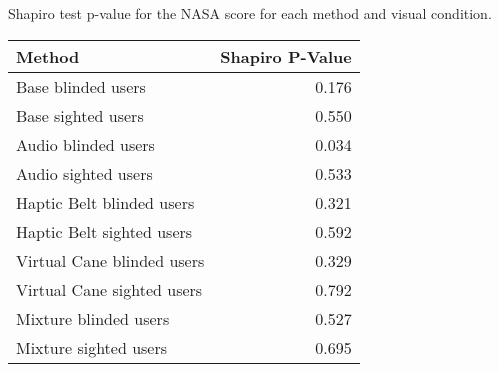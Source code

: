 
\centering
\caption{Shapiro test p-value for the NASA score for each method and visual condition.}
\label{tab:shapiro_nasa_score}
\begin{tabular}{lr}
\toprule
                    Method &  Shapiro P-Value \\
\midrule
        Base blinded users &            0.176 \\
        Base sighted users &            0.550 \\
       Audio blinded users &            0.034 \\
       Audio sighted users &            0.533 \\
 Haptic Belt blinded users &            0.321 \\
 Haptic Belt sighted users &            0.592 \\
Virtual Cane blinded users &            0.329 \\
Virtual Cane sighted users &            0.792 \\
     Mixture blinded users &            0.527 \\
     Mixture sighted users &            0.695 \\
\bottomrule
\end{tabular}
